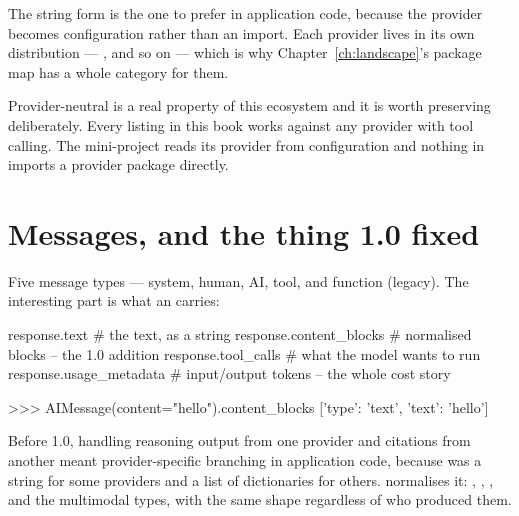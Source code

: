 The  string form is the one to prefer in application code,
because the provider becomes configuration rather than an import. Each provider
lives in its own distribution --- ,
 and so on --- which is why
Chapter~\ref{ch:landscape}'s package map has a whole category for them.

\begin{note}
Provider-neutral is a real property of this ecosystem and it is worth preserving
deliberately. Every listing in this book works against any provider with tool
calling. The mini-project reads its provider from configuration and nothing in
 imports a provider package directly.
\end{note}

\section{Messages, and the thing 1.0 fixed}
\label{sec:content-blocks}

Five message types --- system, human, AI, tool, and function (legacy). The
interesting part is what an  carries:

\begin{python}[caption={What comes back}, label={lst:message-surface}]
response.text              # the text, as a string
response.content_blocks    # normalised blocks -- the 1.0 addition
response.tool_calls        # what the model wants to run
response.usage_metadata    # input/output tokens -- the whole cost story
\end{python}

\begin{console}
>>> AIMessage(content="hello").content_blocks
[{'type': 'text', 'text': 'hello'}]
\end{console}


Before 1.0, handling reasoning output from one provider and citations from
another meant provider-specific branching in application code, because
 was a string for some providers and a list of dictionaries for
others.  normalises it: , ,
,  and the multimodal types, with the same shape
regardless of who produced them.

